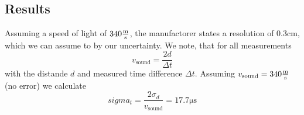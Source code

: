 \subsection{Results}

Assuming a speed of light of $340 \unit{\frac{\meter}{\second}}$, the manufactorer states a resolution of $0.3 \unit{\centi\meter}$, which we can assume to by our uncertainty. We note, that for all measurements
\begin{equation}
    v_\text{sound} = \frac{2d}{\Delta t}
\end{equation}
\noindent
with the distande $d$ and measured time difference $\Delta t$. Assuming $v_\text{sound}=340 \unit{\frac{\meter}{\second}}$ (no error) we calculate
\begin{equation}
    sigma_t = \frac{2\sigma_d}{v_\text{sound}} = 17.7 \unit{\micro\second}
\end{equation}
\noindent

